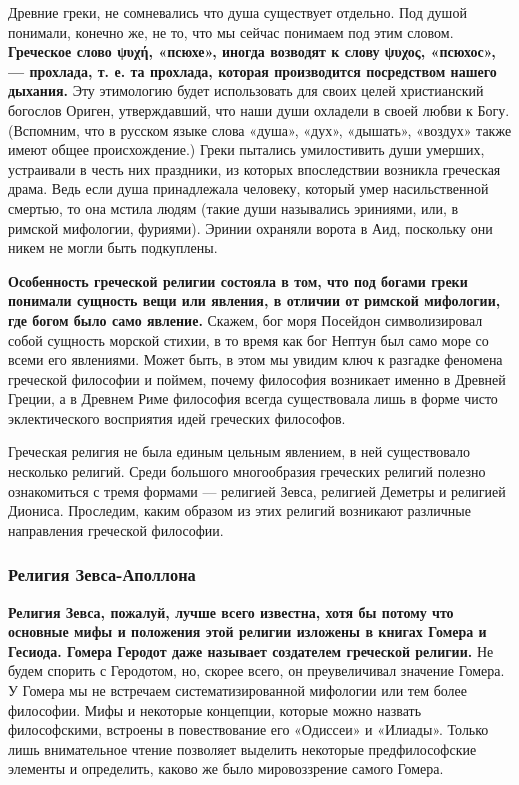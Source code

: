 	Древние греки, не сомневались что душа существует отдельно. Под душой понимали, 
	конечно же, не то, что мы сейчас 
	понимаем под этим словом. \textbf{Греческое слово ψυχή, «псюхе», иногда возводят к слову 
	ψυχος, «псюхос», — прохлада, т. е. та прохлада, которая производится посредством нашего 
	дыхания.} Эту этимологию будет использовать для своих целей христианский богослов Ориген, 
	утверждавший, что наши души охладели в своей любви к Богу. (Вспомним, что в русском 
	языке слова «душа», «дух», «дышать», «воздух» также имеют общее происхождение.) Греки 
	пытались умилостивить души умерших, устраивали в честь них праздники, из которых 
	впоследствии возникла греческая драма. Ведь если душа принадлежала человеку, который 
	умер насильственной смертью, то она мстила людям (такие души назывались эриниями, или, 
	в римской мифологии, фуриями). Эринии охраняли ворота в Аид, поскольку они никем не 
	могли быть подкуплены. 
    
    \par \textbf{Особенность греческой религии состояла в том, что под богами греки понимали 
	сущность вещи или явления, в отличии от римской мифологии, где богом было само явление.} 
	Скажем, 
	бог моря Посейдон символизировал собой сущность морской стихии, в то время как бог Нептун 
	был само море со всеми его явлениями. Может быть, в этом мы увидим ключ к разгадке 
	феномена греческой философии и поймем, почему философия возникает именно в Древней 
	Греции, а в Древнем Риме философия всегда существовала лишь в форме чисто эклектического 
	восприятия идей греческих философов.
    
    \par Греческая религия не была единым цельным явлением, в ней существовало несколько 
	религий. Среди большого многообразия греческих религий полезно ознакомиться с тремя 
	формами — религией Зевса, религией Деметры и религией Диониса. Проследим, каким образом 
	из этих религий возникают различные направления греческой философии.
    
    \subsubsection{Религия Зевса-Аполлона}
    
    \par \textbf{Религия Зевса, пожалуй, лучше всего известна, хотя бы потому что основные мифы 
	и положения этой религии изложены в книгах Гомера и Гесиода. Гомера Геродот даже 
	называет создателем греческой религии.} Не будем спорить с Геродотом, но, скорее всего, 
	он преувеличивал значение Гомера. У Гомера мы не встречаем систематизированной мифологии 
	или тем более философии. Мифы и некоторые концепции, которые можно назвать философскими, 
	встроены в повествование его «Одиссеи» и «Илиады». Только лишь внимательное чтение 
	позволяет выделить некоторые предфилософские элементы и определить, каково же было 
	мировоззрение самого Гомера.
    
